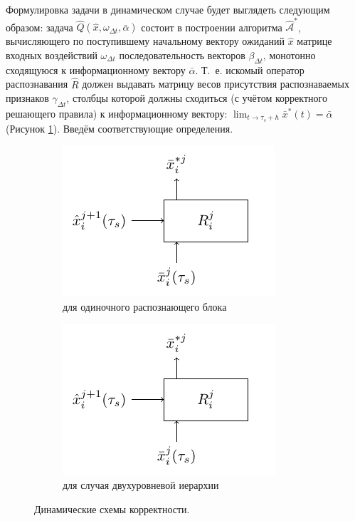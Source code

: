 \documentclass[a4paper, 12pt]{article}
\theoremstyle{plain}
\begin{document}
	Формулировка задачи в динамическом случае будет выглядеть следующим образом: задача $\hat{Q}(\hat{x}, \omega_{{\Delta}t}, \bar{\alpha})$ состоит в построении алгоритма $\hat{\mathcal A}^*$, вычисляющего по поступившему начальному вектору ожиданий $\hat{x}$ матрице входных воздействий $\omega_{{\Delta}t}$  последовательность векторов $\beta_{\Delta{t}}$, монотонно сходящуюся к информационному вектору $\bar{\alpha}$. Т.~е. искомый оператор распознавания $\hat{R}$ должен выдавать матрицу весов присутствия распознаваемых признаков $\gamma_{\Delta{t}}$, столбцы которой должны сходиться (с учётом корректного решающего правила) к информационному вектору: $\lim_{t\to\tau_s+h}\bar{x}^*(t)=\bar{\alpha}$ (Рисунок \ref{fig:rb_correct_dyn}). Введём соответствующие определения.
	
	\begin{figure}[h]
		\centering
		\begin{subfigure}[b]{0.4\textwidth}
			\includegraphics[width=\linewidth,page=3]{rb_correct}
			\caption{для одиночного распознающего блока}
			\label{fig:rb_correct_dyn}
		\end{subfigure}
		\qquad
		\begin{subfigure}[b]{0.4\textwidth}
			\includegraphics[width=\linewidth,page=4]{rb_correct}
			\caption{для случая двухуровневой иерархии}
			\label{fig:rb_correct_hier}
		\end{subfigure}		
		\caption{Динамические схемы корректности.}
	\end{figure}
	
\end{document}
